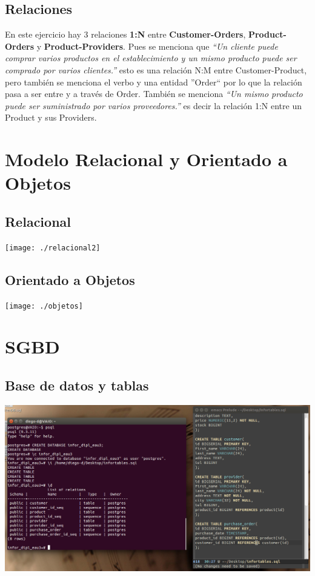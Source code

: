 \documentclass[spanish,12pt,letterpapper]{article}
\begin{document}
	\subsection{Relaciones}	
	En este ejercicio hay 3 relaciones \textbf{1:N} entre \textbf{Customer-Orders}, \textbf{Product-Orders} y \textbf{Product-Providers}. Pues se menciona que \textit{``Un cliente puede comprar varios productos en el establecimiento y un mismo producto puede ser comprado por varios clientes.''} esto es una relación N:M entre Customer-Product, pero también se menciona el verbo y una entidad ''Order`` por lo que la relación pasa a ser entre y a través de Order. También se menciona \textit{``Un mismo producto puede ser suministrado por varios proveedores.''} es decir la relación 1:N entre un Product y sus Providers.
	
	\section{Modelo Relacional y Orientado a Objetos}
	\subsection{Relacional}
	\begin{center}
	\texttt{[image: ./relacional2]}~\\[1cm] 
	\end{center}	
	
	\subsection{Orientado a Objetos}
	\begin{center}
	\texttt{[image: ./objetos]}~\\[1cm] 
	\end{center}
	
	\section{SGBD}
	\subsection{Base de datos y tablas}
	\begin{center}
	\includegraphics[width=1\textwidth]{./tables}~\\[1cm] 
	\end{center}	
	
\end{document}
